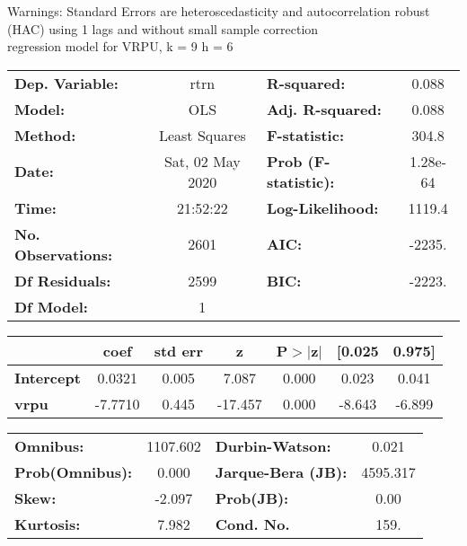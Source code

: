 Warnings: \newline
 [1] Standard Errors are heteroscedasticity and autocorrelation robust (HAC) using 1 lags and without small sample correction\\ 

regression model for VRPU, k = 9 h = 6\begin{center}
\begin{tabular}{lclc}
\toprule
\textbf{Dep. Variable:}    &       rtrn       & \textbf{  R-squared:         } &     0.088   \\
\textbf{Model:}            &       OLS        & \textbf{  Adj. R-squared:    } &     0.088   \\
\textbf{Method:}           &  Least Squares   & \textbf{  F-statistic:       } &     304.8   \\
\textbf{Date:}             & Sat, 02 May 2020 & \textbf{  Prob (F-statistic):} &  1.28e-64   \\
\textbf{Time:}             &     21:52:22     & \textbf{  Log-Likelihood:    } &    1119.4   \\
\textbf{No. Observations:} &        2601      & \textbf{  AIC:               } &    -2235.   \\
\textbf{Df Residuals:}     &        2599      & \textbf{  BIC:               } &    -2223.   \\
\textbf{Df Model:}         &           1      & \textbf{                     } &             \\
\bottomrule
\end{tabular}
\begin{tabular}{lcccccc}
                   & \textbf{coef} & \textbf{std err} & \textbf{z} & \textbf{P$> |$z$|$} & \textbf{[0.025} & \textbf{0.975]}  \\
\midrule
\textbf{Intercept} &       0.0321  &        0.005     &     7.087  &         0.000        &        0.023    &        0.041     \\
\textbf{vrpu}      &      -7.7710  &        0.445     &   -17.457  &         0.000        &       -8.643    &       -6.899     \\
\bottomrule
\end{tabular}
\begin{tabular}{lclc}
\textbf{Omnibus:}       & 1107.602 & \textbf{  Durbin-Watson:     } &    0.021  \\
\textbf{Prob(Omnibus):} &   0.000  & \textbf{  Jarque-Bera (JB):  } & 4595.317  \\
\textbf{Skew:}          &  -2.097  & \textbf{  Prob(JB):          } &     0.00  \\
\textbf{Kurtosis:}      &   7.982  & \textbf{  Cond. No.          } &     159.  \\
\bottomrule
\end{tabular}
\end{center}

